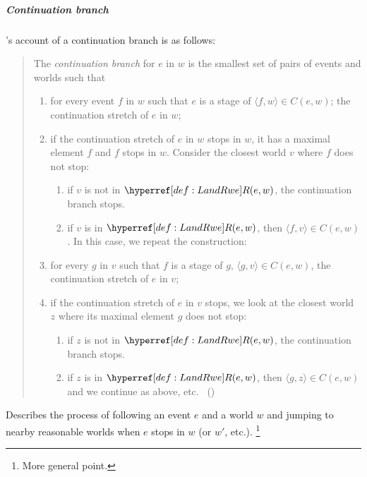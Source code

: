 \subparagraph{Continuation branch}

\begin{note}
  \citeauthor{Landman:1992wh}'s account of a continuation branch is as follows:
  \begin{quote}
    The \emph{continuation branch} for \(e\) in \(w\) is the smallest set of pairs of events and worlds such that
    \begin{enumerate}
    \item
      \label{Landman:CB:continues}
      for every event \(f\) in \(w\) such that \(e\) is a stage of \(\langle f,w \rangle \in C(e,w)\);
      the continuation stretch of \(e\) in \(w\);
    \item
      \label{Landman:CB:stops}
      if the continuation stretch of \(e\) in \(w\) stops in \(w\), it has a maximal element \(f\) and \(f\) stops in \(w\).
      Consider the closest world \(v\) where \(f\) does not stop:
      \begin{enumerate}[label=--]
      \item
        if \(v\) is not in \(\lRwe{w}{e}\), the continuation branch stops.
      \item
        if \(v\) is in \(\lRwe{w}{e}\), then \(\langle f,v \rangle \in C(e,w)\).
        In this case, we repeat the construction:
      \end{enumerate}
    \item
      \label{Landman:CB:continues:again}
      for every \(g\) in \(v\) such that \(f\) is a stage of \(g\), \(\langle g,v \rangle \in C(e,w)\), the continuation stretch of \(e\) in \(v\);
    \item
      \label{Landman:CB:stops:again}
      if the continuation stretch of \(e\) in \(v\) stops, we look at the closest world \(z\) where its maximal element \(g\) does not stop:
      \begin{enumerate}[label=--]
      \item
        if \(z\) is not in \(\lRwe{w}{e}\), the continuation branch stops.
      \item
        if \(z\) is in \(\lRwe{w}{e}\), then \(\langle g,z \rangle \in C(e,w)\) and we continue as above, etc.%
        \mbox{ }\hfill\mbox{(\citeyear[26--27]{Landman:1992wh})}
      \end{enumerate}
    \end{enumerate}
  \end{quote}

  Describes the process of following an event \(e\) and a world \(w\) and jumping to nearby reasonable worlds when \(e\) stops in \(w\) (or \(w'\), etc.).%
  \footnote{
    More general point.

}
\end{note}
